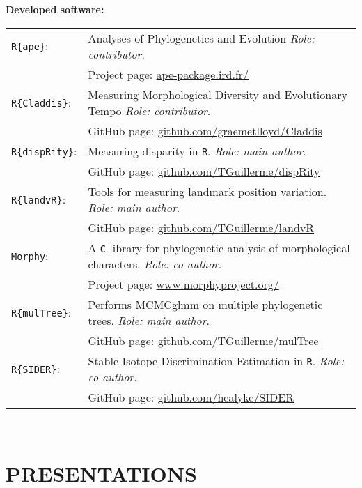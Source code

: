 \documentclass[10pt,a4paper]{article}
\begin{document}
{\raggedright\textbf{Developed software:}\\[1.5ex]
\begin{tabular}{ll}
\texttt{R\{ape\}}: & Analyses of Phylogenetics and Evolution \textit{Role: contributor}. \\
                       & Project page: \href{http://ape-package.ird.fr/}{ape-package.ird.fr/} \\
\texttt{R\{Claddis\}}: & Measuring Morphological Diversity and Evolutionary Tempo \textit{Role: contributor}. \\
                       & GitHub page: \href{https://github.com/graemetlloyd/Claddis}{github.com/graemetlloyd/Claddis} \\
\texttt{R\{dispRity\}}: & Measuring disparity in \texttt{R}. \textit{Role: main author}.\\
                       & GitHub page: \href{https://github.com/TGuillerme/dispRity}{github.com/TGuillerme/dispRity}\\
\texttt{R\{landvR\}}: & Tools for measuring landmark position variation. \textit{Role: main author}. \\
                       & GitHub page: \href{https://github.com/TGuillerme/landvR}{github.com/TGuillerme/landvR} \\
\texttt{Morphy}: & A \texttt{C} library for phylogenetic analysis of morphological characters. \textit{Role: co-author}. \\
                       & Project page: \href{http://www.morphyproject.org/}{www.morphyproject.org/} \\
\texttt{R\{mulTree\}}: & Performs MCMCglmm on multiple phylogenetic trees. \textit{Role: main author}.\\
                       & GitHub page: \href{https://github.com/TGuillerme/mulTree}{github.com/TGuillerme/mulTree} \\
\texttt{R\{SIDER\}}: & Stable Isotope Discrimination Estimation in \texttt{R}. \textit{Role: co-author}. \\
                       & GitHub page: \href{https://github.com/healyke/SIDER}{github.com/healyke/SIDER} \\
\end{tabular} \\


\bigskip
\newpage
\section{PRESENTATIONS}

}
\end{document}
